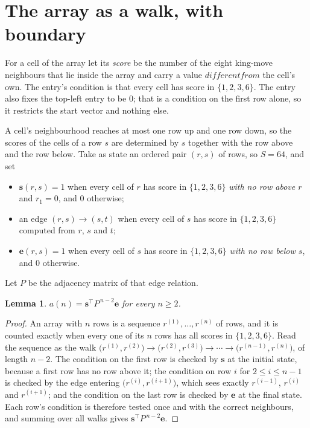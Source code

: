 \documentclass[11pt,a4paper]{article}
\theoremstyle{plain}
\newtheorem{lemma}[theorem]{Lemma}
\theoremstyle{definition}
\begin{document}
\section{The array as a walk, with boundary}

For a cell of the array let its \emph{score} be the number of the eight king-move neighbours that lie inside
the array and carry a value $different from$ the cell's own. The entry's condition is that every cell
has score in $\{1,2,3,6\}$. The entry also fixes the top-left entry to be $0$; that is a condition on the first row alone, so it restricts the start vector and nothing else.

A cell's neighbourhood reaches at most one row up and one row down, so the scores of the
cells of a row $s$ are determined by $s$ together with the row above and the row below.
Take as state an ordered pair $(r,s)$ of rows, so $S=64$, and set
\begin{itemize}
\item $\mathbf{s}(r,s)=1$ when every cell of $r$ has score in $\{1,2,3,6\}$ \emph{with no row
above $r$} and $r_1=0$, and $0$ otherwise;
\item an edge $(r,s)\to(s,t)$ when every cell of $s$ has score in $\{1,2,3,6\}$ computed from
$r$, $s$ and $t$;
\item $\mathbf{e}(r,s)=1$ when every cell of $s$ has score in $\{1,2,3,6\}$ \emph{with no row
below $s$}, and $0$ otherwise.
\end{itemize}
Let $P$ be the adjacency matrix of that edge relation.

\begin{lemma}\label{lem:walk}
$a(n)=\mathbf{s}^{\!\top}P^{\,n-2}\mathbf{e}$ for every $n\ge2$.
\end{lemma}

\begin{proof}
An array with $n$ rows is a sequence $r^{(1)},\dots,r^{(n)}$ of rows, and it is counted
exactly when every one of its $n$ rows has all scores in $\{1,2,3,6\}$. Read the sequence as the
walk $\bigl(r^{(1)},r^{(2)}\bigr)\to\bigl(r^{(2)},r^{(3)}\bigr)\to\cdots\to
\bigl(r^{(n-1)},r^{(n)}\bigr)$, of length $n-2$. The condition on the first row is
checked by $\mathbf{s}$ at the initial state, because a first row has no row above it; the
condition on row $i$ for $2\le i\le n-1$ is checked by the edge entering
$\bigl(r^{(i)},r^{(i+1)}\bigr)$, which sees exactly $r^{(i-1)}$, $r^{(i)}$ and
$r^{(i+1)}$; and the condition on the last row is checked by $\mathbf{e}$ at the final
state. Each row's condition is therefore tested once and with the correct neighbours, and
summing over all walks gives $\mathbf{s}^{\!\top}P^{\,n-2}\mathbf{e}$.
\end{proof}
\end{document}
